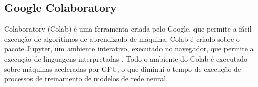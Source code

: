 \subsection{Google Colaboratory}

Colaboratory (Colab) é uma ferramenta criada pelo Google, que permite a fácil execução de algorítimos de aprendizado de máquina. Colab é criado sobre o pacote Jupyter, um ambiente interativo, executado no navegador, que permite a execução de linguagens interpretadas \cite{PER-GRA:2007}. Todo o ambiente do Colab é executado sobre máquinas aceleradas por GPU, o que diminui o tempo de execução de processos de treinamento de modelos de rede neural.
